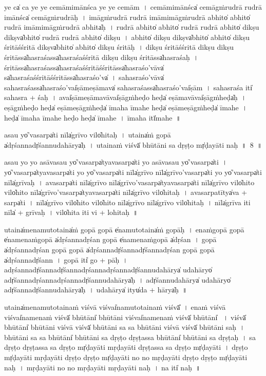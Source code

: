 \documentclass[parskip, DIV=14]{scrartcl}
\begin{document}
{ye ca̍ ca॒ ye ye ce॒māmi॒mānśca॒ ye ye ce॒mām~।
ce॒māmi॒mānśca̍ ce॒māgṁru॒drā ru॒drā  i॒mānśca̍ ce॒māgṁru॒drāḥ~।
i॒māgṁru॒drā ru॒drā  i॒māmi॒māgṁru॒drā a॒bhito̍ a॒bhito̍ ru॒drā  i॒māmi॒māgṁru॒drā a॒bhita̍ḥ~।
ru॒drā a॒bhito̍ a॒bhito̍ ru॒drā ru॒drā a॒bhito̍ di॒kṣu di॒kṣva̍bhito̍ ru॒drā ru॒drā a॒bhito̍ di॒kṣu~।
a॒bhito̍ di॒kṣu di॒kṣva̍bhito̍ a॒bhito̍ di॒kṣu śri॒tāśśri॒tā di॒kṣva̍bhito̍ a॒bhito̍ di॒kṣu śri॒tāḥ~।
di॒kṣu śri॒tāśśri॒tā di॒kṣu di॒kṣu śri॒tāssa̍hasra॒śassa̍hasra॒śaśśri॒tā di॒kṣu di॒kṣu śri॒tāssa̍hasra॒śaḥ~।
śri॒tāssa̍hasra॒śassa̍hasra॒śaśśri॒tāśśri॒tāssa̍hasra॒śo'vāva̍ sa̍hasra॒śaśśri॒tāśśri॒tāssa̍hasra॒śo'va̍~।
sa॒ha॒sra॒śo'vāva̍ sahasra॒śassa̍hasra॒śo'vai̍ṣāmeṣā॒mava̍ sahasra॒śassa̍hasra॒śo'vai̍ṣām~।
sa॒ha॒sra॒śa iti̍ sahasra + śaḥ~।
avai̍ṣāmeṣā॒mavāvai̍ṣā॒gṁ॒heḍo॒ heḍa̍ eṣā॒mavāvai̍ṣā॒gṁ॒heḍa̍ḥ~।
e॒ṣā॒gṁ॒heḍo॒ heḍa̍ eṣāmeṣā॒gṁ॒heḍa̍ īmaha īmahe॒ heḍa̍ eṣāmeṣā॒gṁ॒heḍa̍ īmahe~।
heḍa̍ īmaha īmahe॒ heḍo॒ heḍa̍ īmahe~।
ī॒ma॒ha॒ itī̍mahe~॥

\vspace{0.5cm}
a॒sau yo̍'vasarpa̍ti॒ nīla̍grīvo॒ vilo̍hitaḥ~।
u॒taina̍ṁ go॒pā a̍dṛśa॒nnadṛ̍śannudahā॒rya̍ḥ~।
u॒taina॒ṁ viśvā̍ bhū॒tāni॒ sa dṛ॒ṣṭo mṛ̍ḍayāti naḥ~॥~8~॥

a॒sau yo yo a॒sāva॒sau yo̍'va॒sarpa̍tyava॒sarpa̍ti॒ yo a॒sāva॒sau yo̍'va॒sarpa̍ti~।
yo̍'va॒sarpa̍tyava॒sarpa̍ti॒ yo yo̍'va॒sarpa̍ti॒ nīla̍grīvo॒ nīla̍grīvo'va॒sarpa̍ti॒ yo yo̍'va॒sarpa̍ti॒ nīla̍grīvaḥ~।
a॒va॒sarpa̍ti॒ nīla̍grīvo॒ nīla̍grīvo'va॒sarpa̍tyava॒sarpa̍ti॒ nīla̍grīvo॒ vilo̍hito॒ vilo̍hito॒ nīla̍grīvo॒'va॒sarpa̍tyava॒sarpa̍ti॒ nīla̍grīvo॒ vilo̍hitaḥ~।
a॒va॒sarpa॒tītya̍va + sarpa̍ti~।
nīla̍grīvo॒ vilo̍hito॒  vilo̍hito॒ nīla̍grīvo॒ nīla̍grīvo॒ vilo̍hitaḥ~।
nīla̍grīva॒ iti॒ nīla̍ + grī॒va॒ḥ~।
vilo̍hita॒ iti॒ vi + lo॒hi॒ta॒ḥ~॥

u॒taina̍menamu॒totaina̍ṁ go॒pā go॒pā e̍namu॒totaina̍ṁ go॒pāḥ~।
e॒na॒ṁgo॒pā go॒pā e̍namenaṁgo॒pā a̍dṛśannadṛśan go॒pā e̍namenaṁgo॒pā a̍dṛśan~।
go॒pā a̍dṛśannadṛśan go॒pā go॒pā a̍dṛśa॒nnadṛ̍śa॒nnadṛ̍śannadṛśan go॒pā go॒pā a̍dṛśa॒nnadṛ̍śann~।
go॒pā iti̍ go + pāḥ~।
a॒dṛ॒śa॒nnadṛ̍śa॒nnadṛ̍śannadṛśannadṛśa॒nnadṛ̍śannudahā॒rya̍ udahā॒ryo̍ adṛ̍śannadṛśannadṛśa॒nnadṛ̍śannudahā॒rya̍ḥ~।
adṛ̍śannudahā॒rya̍ udahā॒ryo̍ adṛ̍śa॒nnadṛ̍śannudahā॒rya̍ḥ~।
u॒da॒hā॒rya̍ ityu̍da + hā॒rya̍ḥ~॥

u॒taina̍menamu॒totaina॒ṁ viśvā॒ viśvai̍namu॒totaina॒ṁ viśvā̎~।
e॒na॒ṁ viśvā॒ viśvai̍namena॒ṁ viśvā̍ bhū॒tāni̍ bhū॒tāni॒ viśvai̍namena॒ṁ viśvā̍ bhū॒tāni̍ ~।
viśvā̍ bhū॒tāni̍ bhū॒tāni॒ viśvā॒ viśvā̍ bhū॒tāni॒ sa sa bhū॒tāni॒ viśvā॒ viśvā̍ bhū॒tāni॒ saḥ~।
bhū॒tāni॒ sa sa bhū॒tāni̍ bhū॒tāni॒ sa dṛ॒ṣṭo dṛ॒ṣṭassa bhū॒tāni̍ bhū॒tāni॒ sa dṛ॒ṣṭaḥ~।
sa dṛ॒ṣṭo dṛ॒ṣṭassa sa dṛ॒ṣṭo mṛ̍ḍayāti mṛḍayāti dṛ॒ṣṭassa sa dṛ॒ṣṭo mṛ̍ḍayāti~।
dṛ॒ṣṭo mṛ̍ḍayāti mṛḍayāti dṛ॒ṣṭo dṛ॒ṣṭo mṛ̍ḍayāti no no mṛḍayāti dṛ॒ṣṭo dṛ॒ṣṭo mṛ̍ḍayāti naḥ~।
mṛ॒ḍa॒yā॒ti॒ no॒ no॒ mṛ॒ḍa॒yā॒ti॒ mṛ॒ḍa॒yā॒ti॒ na॒ḥ~। %
na॒ iti̍ naḥ~॥

}
\end{document}
